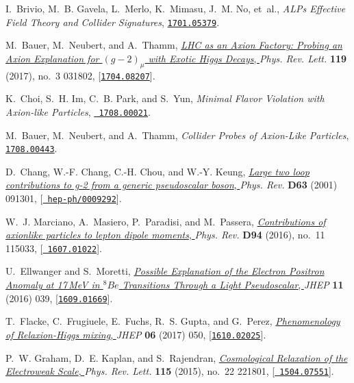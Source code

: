\documentclass[11pt,a4paper]{article}
\begin{document}
\begin{thebibliography}{10}
I.~Brivio, M.~B. Gavela, L.~Merlo, K.~Mimasu, J.~M. No, et~al., {\it {ALPs
  Effective Field Theory and Collider Signatures}},
  \href{http://arxiv.org/abs/1701.05379}{{\tt 1701.05379}}.

M.~Bauer, M.~Neubert, and A.~Thamm,
  \href{http://dx.doi.org/10.1103/PhysRevLett.119.031802}{{\it {LHC as an Axion
  Factory: Probing an Axion Explanation for $(g-2)_\mu$ with Exotic Higgs
  Decays}}, } {\em Phys. Rev. Lett.} {\bf 119} (2017), no.~3 031802,
  [\href{http://arxiv.org/abs/1704.08207}{{\tt 1704.08207}}].

K.~Choi, S.~H. Im, C.~B. Park, and S.~Yun, {\it {Minimal Flavor Violation with
  Axion-like Particles}},  \href{http://arxiv.org/abs/1708.00021}{{\tt
  1708.00021}}.

M.~Bauer, M.~Neubert, and A.~Thamm, {\it {Collider Probes of Axion-Like
  Particles}},  \href{http://arxiv.org/abs/1708.00443}{{\tt 1708.00443}}.

D.~Chang, W.-F. Chang, C.-H. Chou, and W.-Y. Keung,
  \href{http://dx.doi.org/10.1103/PhysRevD.63.091301}{{\it {Large two loop
  contributions to g-2 from a generic pseudoscalar boson}}, } {\em Phys. Rev.}
  {\bf D63} (2001) 091301, [\href{http://arxiv.org/abs/hep-ph/0009292}{{\tt
  hep-ph/0009292}}].

W.~J. Marciano, A.~Masiero, P.~Paradisi, and M.~Passera,
  \href{http://dx.doi.org/10.1103/PhysRevD.94.115033}{{\it {Contributions of
  axionlike particles to lepton dipole moments}}, } {\em Phys. Rev.} {\bf D94}
  (2016), no.~11 115033, [\href{http://arxiv.org/abs/1607.01022}{{\tt
  1607.01022}}].

U.~Ellwanger and S.~Moretti,
  \href{http://dx.doi.org/10.1007/JHEP11(2016)039}{{\it {Possible Explanation
  of the Electron Positron Anomaly at 17\,MeV in $^8Be$ Transitions Through a
  Light Pseudoscalar}}, } {\em JHEP} {\bf 11} (2016) 039,
  [\href{http://arxiv.org/abs/1609.01669}{{\tt 1609.01669}}].

T.~Flacke, C.~Frugiuele, E.~Fuchs, R.~S. Gupta, and G.~Perez,
  \href{http://dx.doi.org/10.1007/JHEP06(2017)050}{{\it {Phenomenology of
  Relaxion-Higgs mixing}}, } {\em JHEP} {\bf 06} (2017) 050,
  [\href{http://arxiv.org/abs/1610.02025}{{\tt 1610.02025}}].

P.~W. Graham, D.~E. Kaplan, and S.~Rajendran,
  \href{http://dx.doi.org/10.1103/PhysRevLett.115.221801}{{\it {Cosmological
  Relaxation of the Electroweak Scale}}, } {\em Phys. Rev. Lett.} {\bf 115}
  (2015), no.~22 221801, [\href{http://arxiv.org/abs/1504.07551}{{\tt
  1504.07551}}].


\end{thebibliography}
\end{document}
